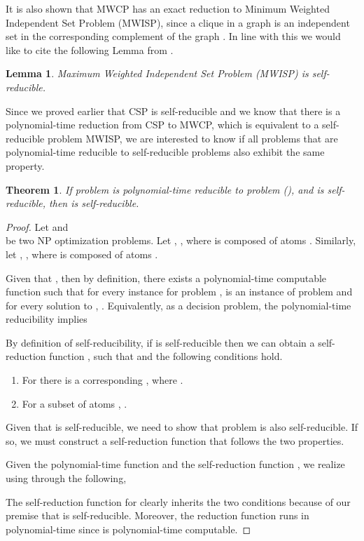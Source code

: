 \documentclass[journal]{acm_proc_article-sp}
\newtheorem{theorem}{Theorem}
\newtheorem{lemma}{Lemma}
\begin{document}
It is also shown that MWCP has an exact reduction to  Minimum Weighted Independent Set Problem (MWISP), since a clique in a graph is an independent set in the corresponding complement of the graph \cite{Garey1979}. In line with this we would like to cite the following Lemma from \cite{Zych2012}. 

\begin{lemma}
Maximum Weighted Independent Set Problem (MWISP) is \textit{self-reducible}.
\end{lemma}

Since we proved earlier that CSP is self-reducible and we know that there is a polynomial-time reduction from CSP to MWCP, which is equivalent to a self-reducible problem MWISP, we are interested to know if all problems that are polynomial-time reducible to self-reducible problems also exhibit the same property.


\begin{theorem} \label{thm:gen_selfreduc}
If problem  is polynomial-time reducible to problem  (), and  is self-reducible, then   is self-reducible. 
\end{theorem}

\begin{proof}
Let  and \\
 be two NP optimization problems. Let , , where  is composed of atoms . Similarly, let , , where  is composed of atoms .

Given that , then by definition, there exists a polynomial-time computable function  such that  for every instance  for problem ,  is an instance of problem  and for every solution  to , . Equivalently, as a decision problem, the polynomial-time reducibility implies
  
By definition of self-reducibility, if  is self-reducible then we can obtain a self-reduction function , such that  and the following conditions hold.
\begin{enumerate}

\item For  there is a corresponding  , where .

\item For a subset of atoms ,   .  
\end{enumerate}

Given that  is self-reducible, we need to show that problem  is also self-reducible.
If so, we must construct a self-reduction function  that follows the two properties.
 
Given the polynomial-time function  and the self-reduction function , we realize  using  through the following,
  
The self-reduction function for  clearly inherits the two conditions because of our premise that  is self-reducible. Moreover, the reduction function runs in polynomial-time since  is polynomial-time computable.
 \end{proof}
 
\end{document}
